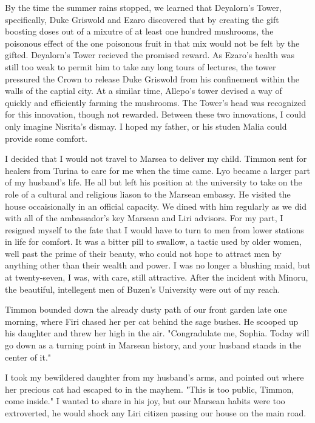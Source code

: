 \documentclass{article}
\begin{document}
By the time the summer rains stopped, we learned that Deyalorn's Tower, specifically, Duke Griswold and Ezaro discovered that by creating the gift boosting doses out of a mixutre of at least one hundred mushrooms, the poisonous effect of the one poisonous fruit in that mix would not be felt by the gifted. Deyalorn's Tower recieved the promised reward. As Ezaro's health was still too weak to permit him to take any long tours of lectures, the tower pressured the Crown to release Duke Griswold from his confinement within the walls of the captial city. At a similar time, Allepo's tower devised a way of quickly and efficiently farming the mushrooms. The Tower's head was recognized for this innovation, though not rewarded. Between these two innovations, I could only imagine Nisrita's dismay. I hoped my father, or his studen Malia could provide some comfort. 

I decided that I would not travel to Marsea to deliver my child. Timmon sent for healers from Turina to care for me when the time came. Lyo became a larger part of my husband's life. He all but left his position at the university to take on the role of a cultural and religious liason to the Marsean embassy. He visited the house occaisionally in an official capacity. We dined with him regularly as we did with all of the ambassador's key Marsean and Liri advisors. For my part, I resigned myself to the fate that I would have to turn to men from lower stations in life for comfort. It was a bitter pill to swallow, a tactic used by older women, well past the prime of their beauty, who could not hope to attract men by anything other than their wealth and power. I was no longer a blushing maid, but at twenty-seven, I was, with care, still attractive. After the incident with Minoru, the beautiful, intellegent men of Buzen's University were out of my reach.

Timmon bounded down the already dusty path of our front garden late one morning, where Firi chased her per cat behind the sage bushes. He scooped up his daughter and threw her high in the air. "Congradulate me, Sophia. Today will go down as a turning point in Marsean history, and your husband stands in the center of it."

I took my bewildered daughter from my husband's arms, and pointed out where her precious cat had escaped to in the mayhem. "This is too public, Timmon, come inside." I wanted to share in his joy, but our Marsean habits were too extroverted, he would shock any Liri citizen passing our house on the main road.
\end{document}
